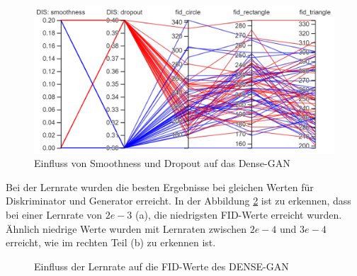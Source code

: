 \begin{figure}[H]
	\centering
	\includegraphics[width=0.6\textheight]{kapitel/5_ergebnisse/densegan/hyperparameter_dropout_smooth.PNG}
	\caption{Einfluss von Smoothness und Dropout auf das Dense-GAN}
	\label{ergebnis:densegan-hyper-smoot-drop}
\end{figure}

Bei der Lernrate wurden die besten Ergebnisse bei gleichen Werten für Diskriminator und Generator erreicht.  
In der Abbildung \ref{ergebnis:densegan-lr} ist zu erkennen, dass bei einer Lernrate von \(2e-3\) (a), die niedrigsten FID-Werte erreicht wurden.
Ähnlich niedrige Werte wurden mit Lernraten zwischen \(2e-4\) und \(3e-4\) erreicht, wie im rechten Teil (b) zu erkennen ist.
 
 \begin{figure}[H]
 	\centering
 	\qquad
 	\caption{Einfluss der Lernrate auf die FID-Werte des DENSE-GAN}
 	\label{ergebnis:densegan-lr}
 \end{figure}

